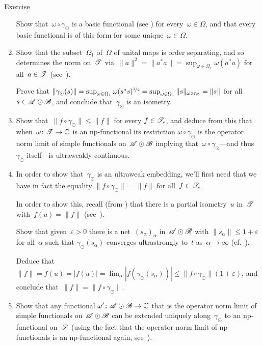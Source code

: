 \documentclass[a]{subfiles}
\begin{document}
\begin{parsec}
\begin{point}{Exercise}
\begin{enumerate}
Show that~$\omega\circ \gamma_\odot$ is a basic functional
(see )
for every~$\omega\in\Omega$,
and that every basic functional is of this form
for some unique~$\omega\in\Omega$.

\item
Show that the subset~$\Omega_1$ of~$\Omega$
of unital maps is order separating,
and so determines the norm on~$\mathscr{T}$
via~$\|a\|^2=\|a^*a\| = \sup_{\omega\in\Omega_1} \omega(a^*a)$
for all~$a\in\mathscr{T}$
(see~).

Prove that $\|\gamma_\odot(s)\|
=\sup_{\omega\in\Omega_1} \omega(s^*s)^{\nicefrac{1}{2}}
=\sup_{\omega\in\Omega_1}
\|s\|_{\omega\circ \tau_\odot}=\|s\|$
for all~$s\in\mathscr{A}\odot\mathscr{B}$,
and 
conclude
that~$\gamma_\odot$ is an isometry.

\item
Show that~$\|f\circ\gamma_\odot\|\leq \|f\|$
for every $f\in\mathscr{T}_*$,
and deduce from this
that when~$\omega\colon \mathscr{T}\to\mathbb{C}$
is an np-functional
its restriction $\omega\circ\gamma_\odot$
is the operator norm limit
of simple functionals on~$\mathscr{A}\odot\mathscr{B}$
implying that~$\omega\circ\gamma_\odot$---and
thus $\gamma_\odot$ itself---is ultraweakly continuous.

\item
In order to show that~$\gamma_\odot$ is an ultraweak embedding,
we'll first need that we have
in fact the equality $\|f\circ \gamma_\odot\|=\|f\|$
for all~$f\in\mathscr{T}_*$.

In order to show this,
recall 
(from )
that there is a partial isometry~$u$ in~$\mathscr{T}$
with~$f(u)=\|f\|$ (see~). 

Show that given~$\varepsilon>0$ 
there is a net~$(s_\alpha)_\alpha$
in~$\mathscr{A}\odot\mathscr{B}$
with $\|s_\alpha\|\leq 1+\varepsilon$ for all~$\alpha$
such that $\gamma_\odot(s_\alpha)$
converges ultrastrongly to~$t$ as~$\alpha\to\infty$
(cf.~).

Deduce that $\|f\|=f(u)=\left|f(u)\right|
=\lim_\alpha \left|f(\gamma_\odot(s_\alpha))\right|
\leq \|f\circ \gamma_\odot\| (1+\varepsilon)$,
and
conclude that~$\|f\|=\|f\circ\gamma_\odot\|$.

\item
Show that any functional $\omega'\colon \mathscr{A}\odot\mathscr{B}\to\mathbb{C}$
that is the operator norm limit of simple functionals
on~$\mathscr{A}\odot\mathscr{B}$
can be extended uniquely along~$\gamma_\odot$
to an np-functional on~$\mathscr{T}$
(using the fact that the operator
norm limit of np-functionals is an np-functional again,
see~).


\end{enumerate}
\end{point}
\end{parsec}
\end{document}
